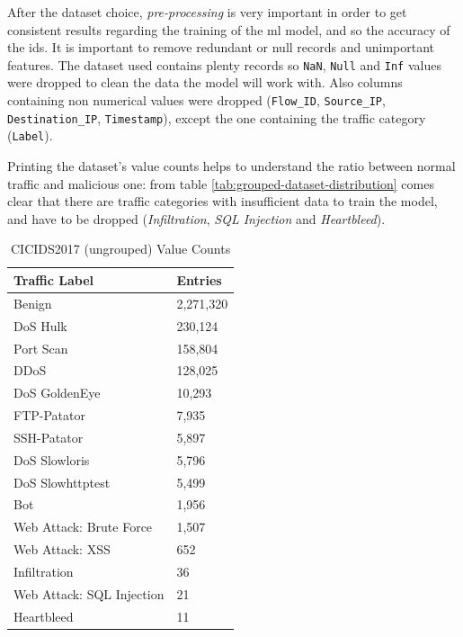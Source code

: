 After the dataset choice, \textit{pre-processing} is very important in order to get consistent results regarding the training of the \gls{ml} model, and so the accuracy of the \gls{ids}. It is important to remove redundant or null records and unimportant features. The dataset used contains plenty records so \texttt{NaN}, \texttt{Null} and \texttt{Inf} values were dropped to clean the data the model will work with. Also columns containing non numerical values were dropped (\texttt{Flow\_ID}, \texttt{Source\_IP}, \texttt{Destination\_IP}, \texttt{Timestamp}), except the one containing the traffic category (\texttt{Label}).
\par Printing the dataset's value counts helps to understand the ratio between normal traffic and malicious one: from table \ref{tab:grouped-dataset-distribution} comes clear that there are traffic categories with insufficient data to train the model, and have to be dropped (\textit{Infiltration}, \textit{SQL Injection} and \textit{Heartbleed}). 

\begin{table}[h!]
    \centering
    \begin{tabular}{l|l}
        \toprule 
        Traffic Label & Entries \\
        \midrule
        \rowcolor{black!10} Benign & 2,271,320 \\
        DoS Hulk & 230,124 \\
        \rowcolor{black!10} Port Scan & 158,804 \\
        DDoS & 128,025 \\
        \rowcolor{black!10} DoS GoldenEye & 10,293 \\
        FTP-Patator & 7,935 \\
        \rowcolor{black!10} SSH-Patator & 5,897 \\
        DoS Slowloris & 5,796 \\
        \rowcolor{black!10} DoS Slowhttptest & 5,499 \\
        Bot & 1,956 \\
        \rowcolor{black!10} Web Attack: Brute Force & 1,507 \\
        Web Attack: XSS & 652 \\
        \rowcolor{black!10} Infiltration & 36 \\
        Web Attack: SQL Injection & 21 \\
        \rowcolor{black!10} Heartbleed & 11 \\
        \bottomrule
    \end{tabular}
    \caption{CICIDS2017 (ungrouped) Value Counts}
    \label{tab:dataset-distribution}
\end{table}

